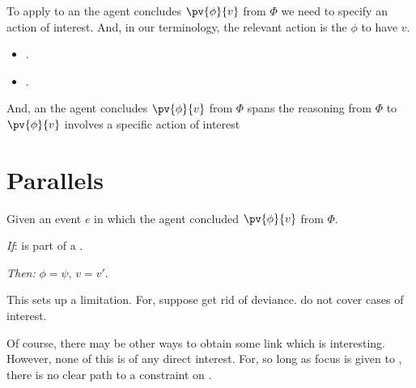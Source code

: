 \begin{note}
  
  To apply  to an \eiw{} the agent concludes \(\pv{\phi}{v}\) from \(\Phi\) we need to specify an action of interest.
  And, in our terminology, the relevant action is the \agents{} \evaling{} \(\phi\) to have  \(v\).

  \begin{itemize}
  \item
    .
  \item
    .
  \end{itemize}
  
  And, an \eiw{} the agent concludes \(\pv{\phi}{v}\) from \(\Phi\) spans the \agents{} reasoning from \(\Phi\) to \(\pv{\phi}{v}\) involves a specific action of interest
  
\end{note}



\begin{note}
  
\end{note}



\section{Parallels}
\label{sec:parallel}

\begin{note}
  \begin{proposition}
    Given an event \(e\) in which the agent concluded \(\pv{\phi}{v}\) from \(\Phi\).

    \begin{itenum}
    \item[\emph{If}:]
       is part of a \rationalisation{}.
    \item[\emph{Then:}]
      \(\phi = \psi\), \(v = v'\).
    \end{itenum}
  \end{proposition}
\end{note}


\begin{note}
  This sets up a limitation.
  For, suppose get rid of deviance.
   do not cover cases of interest.

  Of course, there may be other ways to obtain some link which is interesting.
  However, none of this is of any direct interest.
  For, so long as focus is given to , there is no clear path to a constraint on .
\end{note}


